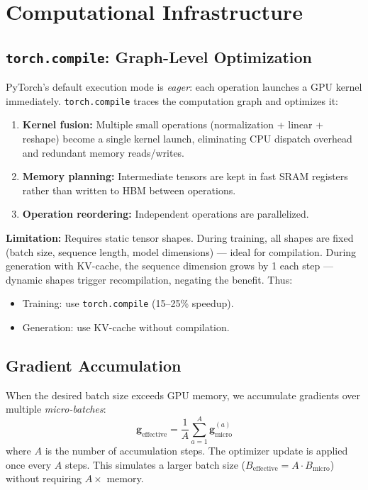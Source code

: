 \documentclass[11pt, a4paper]{article}
\theoremstyle{definition}
\begin{document}
\section{Computational Infrastructure}

\subsection{\texttt{torch.compile}: Graph-Level Optimization}

PyTorch's default execution mode is \emph{eager}: each operation launches a GPU kernel immediately. \texttt{torch.compile} traces the computation graph and optimizes it:

\begin{enumerate}
    \item \textbf{Kernel fusion:} Multiple small operations (normalization + linear + reshape) become a single kernel launch, eliminating CPU dispatch overhead and redundant memory reads/writes.
    \item \textbf{Memory planning:} Intermediate tensors are kept in fast SRAM registers rather than written to HBM between operations.
    \item \textbf{Operation reordering:} Independent operations are parallelized.
\end{enumerate}

\textbf{Limitation:} Requires static tensor shapes. During training, all shapes are fixed (batch size, sequence length, model dimensions) — ideal for compilation. During generation with KV-cache, the sequence dimension grows by 1 each step — dynamic shapes trigger recompilation, negating the benefit. Thus:
\begin{itemize}[nosep]
    \item Training: use \texttt{torch.compile} (15--25\% speedup).
    \item Generation: use KV-cache without compilation.
\end{itemize}

\subsection{Gradient Accumulation}

When the desired batch size exceeds GPU memory, we accumulate gradients over multiple \emph{micro-batches}:
\begin{equation}
    \bm{g}_{\text{effective}} = \frac{1}{A} \sum_{a=1}^{A} \bm{g}_{\text{micro}}^{(a)}
\end{equation}
where $A$ is the number of accumulation steps. The optimizer update is applied once every $A$ steps. This simulates a larger batch size ($B_{\text{effective}} = A \cdot B_{\text{micro}}$) without requiring $A\times$ memory.

\end{document}
